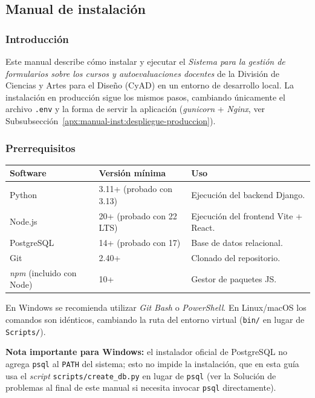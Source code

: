 \subsection{Manual de instalación}\label{apx:manual-instalacion}
\justifying

\subsubsection{Introducción}
Este manual describe cómo instalar y ejecutar el \emph{Sistema para la gestión de formularios sobre los cursos y autoevaluaciones docentes} de la División de Ciencias y Artes para el Diseño (CyAD) en un entorno de desarrollo local. La instalación en producción sigue los mismos pasos, cambiando únicamente el archivo \texttt{.env} y la forma de servir la aplicación (\emph{gunicorn} + \emph{Nginx}, ver Subsubsección~\ref{apx:manual-inst:despliegue-produccion}).

\subsubsection{Prerrequisitos}

\begin{longtable}{p{} p{} p{}}
    \toprule
    \textbf{Software} & \textbf{Versión mínima} & \textbf{Uso} \\
    \midrule
    \endhead
    Python & 3.11+ (probado con 3.13) & Ejecución del backend Django. \\
    \midrule
    Node.js & 20+ (probado con 22 LTS) & Ejecución del frontend Vite + React. \\
    \midrule
    PostgreSQL & 14+ (probado con 17) & Base de datos relacional. \\
    \midrule
    Git & 2.40+ & Clonado del repositorio. \\
    \midrule
    \emph{npm} (incluido con Node) & 10+ & Gestor de paquetes JS. \\
    \bottomrule
\end{longtable}

En Windows se recomienda utilizar \emph{Git Bash} o \emph{PowerShell}. En Linux/macOS los comandos son idénticos, cambiando la ruta del entorno virtual (\texttt{bin/} en lugar de \texttt{Scripts/}).

\textbf{Nota importante para Windows:} el instalador oficial de PostgreSQL no agrega \texttt{psql} al \texttt{PATH} del sistema; esto no impide la instalación, que en esta guía usa el \emph{script} \texttt{scripts/create\_db.py} en lugar de \texttt{psql} (ver la Solución de problemas al final de este manual si necesita invocar \texttt{psql} directamente).

